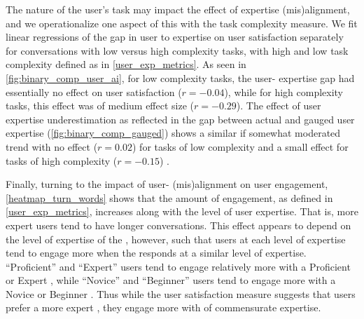 The nature of the user's task may impact the effect of expertise (mis)alignment, and we operationalize one aspect of this with the task complexity measure. We fit linear regressions of the gap in user to  expertise on user satisfaction separately for conversations with low versus high complexity tasks, with high and low task complexity defined as in \cref{user_exp_metrics}. As seen in \autoref{fig:binary_comp_user_ai}, for low complexity tasks, the user- expertise gap had essentially no effect on user satisfaction ($r=-0.04$), while for high complexity tasks, this effect was of medium effect size ($r=-0.29$). The effect of user expertise underestimation as reflected in the gap between actual and gauged user expertise (\autoref{fig:binary_comp_gauged}) shows a similar if somewhat moderated trend with no effect ($r=0.02$) for tasks of low complexity and a small effect for tasks of high complexity ($r=-0.15$) .



Finally, turning to the impact of user- (mis)alignment on user engagement, \autoref{heatmap_turn_words} shows that the amount of engagement, as defined in \cref{user_exp_metrics}, increases along with the level of user expertise. That is, more expert users tend to have longer conversations. This effect appears to depend on the level of expertise of the , however, such that users at each level of expertise tend to engage more when the  responds at a similar level of expertise. ``Proficient'' and ``Expert'' users tend to engage relatively more with a Proficient or Expert , while ``Novice'' and ``Beginner'' users tend to engage more with a Novice or Beginner . Thus while the user satisfaction measure suggests that users prefer a more expert , they engage more with  of commensurate expertise.